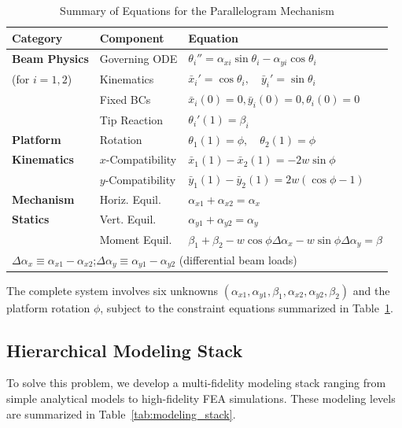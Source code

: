 \documentclass[colorlinks,upint,subscriptcorrection,varvw,hyphenate,balance]{asmeconf} %
\newcommand{\xbar}{\bar{x}}
\newcommand{\ybar}{\bar{y}}
\begin{document}
\begin{table}[t]
\centering
\caption{Summary of Equations for the Parallelogram Mechanism}
\label{tab:constraints}
\begin{tabular}{lll}
\toprule
\textbf{Category} & \textbf{Component} & \textbf{Equation} \\
\midrule
\textbf{Beam Physics} & Governing ODE & $\theta_i'' = \alpha_{xi} \sin\theta_i - \alpha_{yi} \cos\theta_i$ \\
(for $i=1, 2$) & Kinematics & $\xbar_i' = \cos\theta_i, \quad \ybar_i' = \sin\theta_i$ \\
& Fixed BCs & $\xbar_i(0)=0, \ybar_i(0)=0, \theta_i(0)=0$ \\
& Tip Reaction & $\theta_i'(1) = \beta_i$ \\
\midrule
\textbf{Platform} & Rotation & $\theta_1(1) = \phi, \quad \theta_2(1) = \phi$ \\
\textbf{Kinematics} & $x$-Compatibility & $\xbar_1(1) - \xbar_2(1) = -2w\sin\phi$ \\
& $y$-Compatibility & $\ybar_1(1) - \ybar_2(1) = 2w(\cos\phi - 1)$ \\
\midrule
\textbf{Mechanism} & Horiz. Equil. & $\alpha_{x1} + \alpha_{x2} = \alpha_x$ \\
\textbf{Statics} & Vert. Equil. & $\alpha_{y1} + \alpha_{y2} = \alpha_y$ \\
& Moment Equil. & $\beta_1 + \beta_2 - w\cos\phi \Delta\alpha_x - w\sin\phi \Delta\alpha_y = \beta$ \\
\midrule
\multicolumn{3}{l}{\small $\Delta\alpha_x \equiv \alpha_{x1} - \alpha_{x2}$;\quad $\Delta\alpha_y \equiv \alpha_{y1} - \alpha_{y2}$ (differential beam loads)} \\
\bottomrule
\end{tabular}
\end{table}

The complete system involves six unknowns $(\alpha_{x1}, \alpha_{y1}, \beta_1, \alpha_{x2}, \alpha_{y2}, \beta_2)$ and the platform rotation $\phi$, subject to the constraint equations summarized in Table~\ref{tab:constraints}.

\subsection{Hierarchical Modeling Stack}
To solve this problem, we develop a multi-fidelity modeling stack ranging from simple analytical models to high-fidelity FEA simulations. These modeling levels are summarized in Table~\ref{tab:modeling_stack}.
\end{document}
